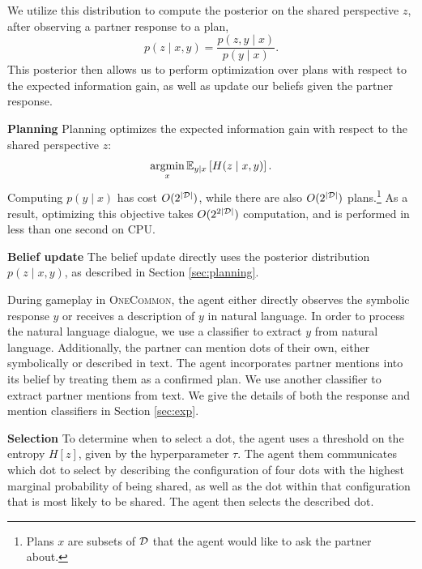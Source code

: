 \documentclass[11pt]{article}
\newcommand{\daniel}[1]{{{\textcolor{red}{(Daniel: #1)}}}}
\begin{document}

We utilize this distribution to compute the posterior on the shared perspective $z$, after observing a partner response to a plan,
$$ p(z \mid x,y) = \frac{ p(z, y \mid x)}{p(y \mid x)}.$$
This posterior then allows us to perform optimization over plans with respect to the expected information gain, as well as update our beliefs given the partner response.


\noindent \textbf{Planning} Planning optimizes the expected information gain with respect to the shared perspective $z$:
$$\operatorname*{argmin}_x \mathbb{E}_{y\mid x}\left[H(z \mid x,y)\right].$$
Computing $p(y \mid x)$ has cost $O(2^{|\mathcal{D}|})$,
while there are also $O(2^{|\mathcal{D}|})$ plans.\footnote{
Plans $x$ are subsets of $\mathcal{D}$ that the agent would like to ask the partner about.
}
As a result, optimizing this objective takes $O(2^{2|\mathcal{D}|})$ computation, and is performed in less than one second on CPU.%

\textbf{Belief update}
The belief update directly uses the posterior distribution $p(z \mid x,y)$, as described in Section \ref{sec:planning}.

During gameplay in \textsc{OneCommon}, the agent either directly observes the symbolic response $y$ or receives a description of $y$ in natural language.
In order to process the natural language dialogue,
we use a classifier to extract $y$ from natural language. 
Additionally, the partner can mention dots of their own, either symbolically or described in text.
The agent incorporates partner mentions into its belief by treating them as a confirmed plan.
We use another classifier to extract partner mentions from text.
We give the details of both the response and mention classifiers in Section \ref{sec:exp}.

\textbf{Selection}
To determine when to select a dot, the agent uses a threshold on the entropy $H[z]$, given by the hyperparameter $\tau$.
The agent them communicates which dot to select by
describing the configuration of four dots with the
highest marginal probability of being shared,
as well as the dot within that configuration that is most likely to be shared.
The agent then selects the described dot.
\end{document}
